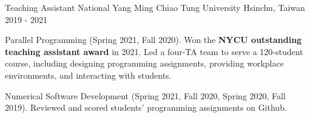 \begin{cventries}
    \vspace{-2mm}

  \cventry
    {Teaching Assistant} %
    {National Yang Ming Chiao Tung University} %
    {Hsinchu, Taiwan} %
    {2019 - 2021} %
    {
      \begin{cvitems} %
        \item {Parallel Programming (Spring 2021, Fall 2020). Won the \textbf{NYCU outstanding teaching assistant award} in 2021.
        Led a four-TA team to serve a 120-student course, including designing programming assignments,
        providing workplace environments, and interacting with students.
        }
        \item {Numerical Software Development (Spring 2021, Fall 2020, Spring 2020, Fall 2019).
        Reviewed and scored students' programming assignments on Github.
        }
      \end{cvitems}
    }

    \vspace{-2mm}





\end{cventries}
